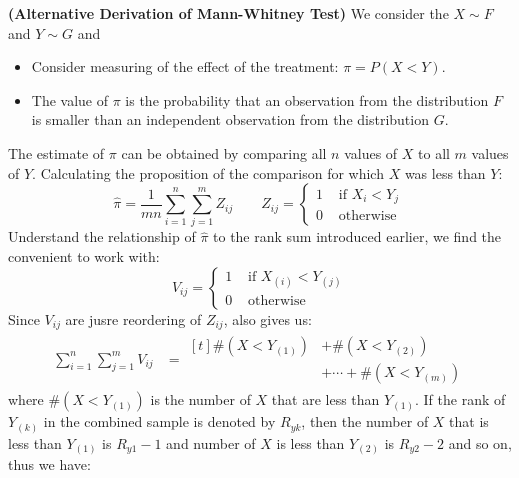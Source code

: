 \begin{remark}{\textbf{(Alternative Derivation of Mann-Whitney Test)}}
    We consider the $X\sim F$ and $Y \sim G$ and 
    \begin{itemize}
        \item Consider measuring of the effect of the treatment: $\pi = P(X < Y)$. 
        \item The value of $\pi$ is the probability that an observation from the distribution $F$ is smaller than an independent observation from the distribution $G$. 
    \end{itemize}
    The estimate of $\pi$ can be obtained by comparing all $n$ values of $X$ to all $m$ values of $Y$. Calculating the proposition of the comparison for which $X$ was less than $Y$:
    \begin{equation*}
        \hat{\pi} = \frac{1}{mn}\sum^n_{i=1}\sum^m_{j=1}Z_{ij} \qquad Z_{ij} = \begin{cases}
            1 & \text{ if } X_i < Y_j \\
            0 & \text{ otherwise }
        \end{cases}
    \end{equation*}
    Understand the relationship of $\hat{\pi}$ to the rank sum introduced earlier, we find the convenient to work with:
    \begin{equation*}
        V_{ij} = \begin{cases}
            1 & \text{ if } X_{(i)} < Y_{(j)} \\
            0 & \text{ otherwise }
        \end{cases}
    \end{equation*}
    Since $V_{ij}$ are jusre reordering of $Z_{ij}$, also gives us:
    \begin{equation*}
    \begin{aligned}
        \sum^n_{i=1}\sum^m_{j=1} V_{ij} &= \begin{aligned}[t]
            \#(X<Y_{(1)}) &+ \#(X < Y_{(2)}) \\
            &+ \cdots + \#(X<Y_{(m)})
        \end{aligned} 
    \end{aligned}
    \end{equation*}
    where $\#(X < Y_{(1)})$ is the number of $X$ that are less than $Y_{(1)}$. If the rank of $Y_{(k)}$ in the combined sample is denoted by $R_{yk}$, then the number of $X$ that is less than $Y_{(1)}$ is $R_{y1} -1$ and number of $X$ is less than $Y_{(2)}$ is $R_{y2} - 2$ and so on, thus we have:

\end{remark}
